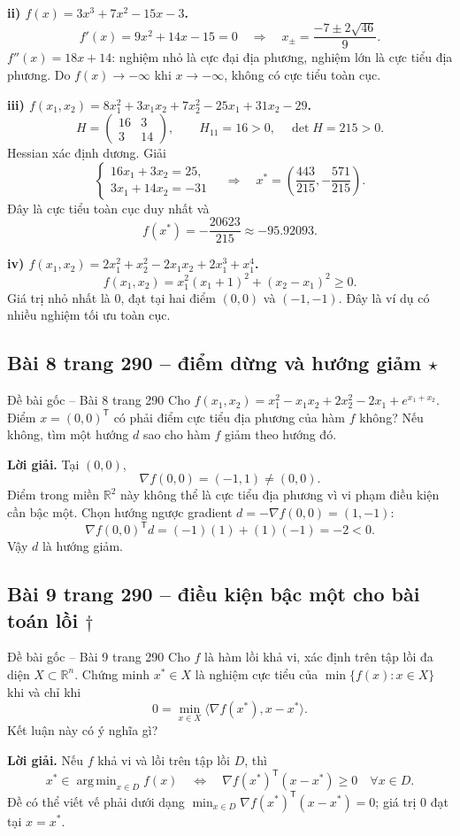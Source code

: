 \documentclass[11pt,a4paper]{article}
\newcommand{\R}{\mathbb{R}}
\newcommand{\grad}{\nabla}
\newcommand{\T}{^{\mathsf T}}
\DeclareMathOperator*{\argmin}{arg\,min}
\begin{document}
\textbf{ii) \(f(x)=3x^3+7x^2-15x-3\).}
\[
f'(x)=9x^2+14x-15=0
\quad\Longrightarrow\quad x_{\pm}=\frac{-7\pm2\sqrt{46}}9.
\]
\(f''(x)=18x+14\): nghiệm nhỏ là cực đại địa phương, nghiệm lớn là cực tiểu địa phương. Do \(f(x)\to-\infty\) khi \(x\to-\infty\), không có cực tiểu toàn cục.

\textbf{iii) \(f(x_1,x_2)=8x_1^2+3x_1x_2+7x_2^2-25x_1+31x_2-29\).}
\[
H=\begin{pmatrix}16&3\\3&14\end{pmatrix},\qquad H_{11}=16>0,\quad \det H=215>0.
\]
Hessian xác định dương. Giải
\[
\begin{cases}16x_1+3x_2=25,\\3x_1+14x_2=-31\end{cases}
\quad\Longrightarrow\quad
x^\ast=\left(\frac{443}{215},-\frac{571}{215}\right).
\]
Đây là cực tiểu toàn cục duy nhất và
\[
f(x^\ast)=-\frac{20623}{215}\approx-95.92093.
\]

\textbf{iv) \(f(x_1,x_2)=2x_1^2+x_2^2-2x_1x_2+2x_1^3+x_1^4\).}
\[
f(x_1,x_2)=x_1^2(x_1+1)^2+(x_2-x_1)^2\ge0.
\]
Giá trị nhỏ nhất là \(0\), đạt tại hai điểm \((0,0)\) và \((-1,-1)\). Đây là ví dụ có nhiều nghiệm tối ưu toàn cục.

\clearpage
\subsection{Bài 8 trang 290 -- điểm dừng và hướng giảm \(\star\)}
\begin{questionbox}{Đề bài gốc -- Bài 8 trang 290}
Cho \(f(x_1,x_2)=x_1^2-x_1x_2+2x_2^2-2x_1+e^{x_1+x_2}\). Điểm \(x=(0,0)\T\) có phải điểm cực tiểu địa phương của hàm \(f\) không? Nếu không, tìm một hướng \(d\) sao cho hàm \(f\) giảm theo hướng đó.
\end{questionbox}
\textbf{Lời giải.}
Tại \((0,0)\),
\[
\grad f(0,0)=(-1,1)\ne(0,0).
\]
Điểm trong miền \(\R^2\) này không thể là cực tiểu địa phương vì vi phạm điều kiện cần bậc một. Chọn hướng ngược gradient \(d=-\grad f(0,0)=(1,-1)\):
\[
\grad f(0,0)\T d=(-1)(1)+(1)(-1)=-2<0.
\]
Vậy \(d\) là hướng giảm.

\clearpage
\subsection{Bài 9 trang 290 -- điều kiện bậc một cho bài toán lồi \(\dagger\)}
\begin{questionbox}{Đề bài gốc -- Bài 9 trang 290}
Cho \(f\) là hàm lồi khả vi, xác định trên tập lồi đa diện \(X\subset\R^n\). Chứng minh \(x^\ast\in X\) là nghiệm cực tiểu của \(\min\{f(x):x\in X\}\) khi và chỉ khi
\[
0=\min_{x\in X}\langle\nabla f(x^\ast),x-x^\ast\rangle.
\]
Kết luận này có ý nghĩa gì?
\end{questionbox}
\textbf{Lời giải.} Nếu \(f\) khả vi và lồi trên tập lồi \(D\), thì
\[
x^\ast\in\argmin_{x\in D}f(x)
\quad\Longleftrightarrow\quad
\grad f(x^\ast)\T(x-x^\ast)\ge0\quad\forall x\in D.
\]
Đề có thể viết vế phải dưới dạng \(\min_{x\in D}\grad f(x^\ast)\T(x-x^\ast)=0\); giá trị \(0\) đạt tại \(x=x^\ast\).
\end{document}
